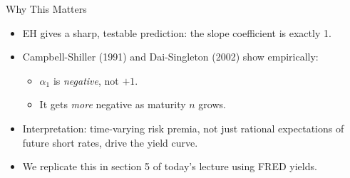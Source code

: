 \documentclass{beamer}
\begin{document}
\begin{frame}{Why This Matters}
  \begin{itemize}
    \item EH gives a sharp, testable prediction: the slope coefficient is exactly 1.
    \item Campbell-Shiller (1991) and Dai-Singleton (2002) show empirically:
      \begin{itemize}
        \item $\alpha_1$ is \emph{negative}, not $+1$.
        \item It gets \emph{more} negative as maturity $n$ grows.
      \end{itemize}
    \item Interpretation: time-varying risk premia, not just rational expectations of future short rates, drive the yield curve.
    \item We replicate this in section 5 of today's lecture using FRED yields.
  \end{itemize}
\end{frame}
\end{document}
